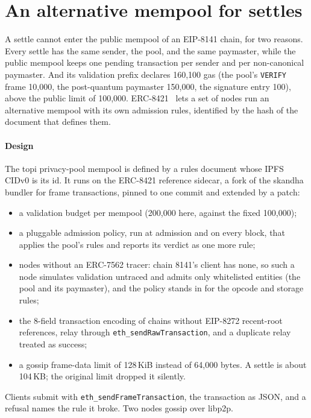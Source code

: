 \documentclass[11pt,a4paper]{article}
\newcommand{\code}[1]{\texttt{\small #1}}
\begin{document}
\section{An alternative mempool for settles}\label{sec:mempool}

A settle cannot enter the public mempool of an EIP-8141 chain, for two reasons. Every settle has the same
sender, the pool, and the same paymaster, while the public mempool keeps one pending transaction per
sender and per non-canonical paymaster. And its validation prefix declares 160,100 gas (the pool's
\code{VERIFY} frame 10,000, the post-quantum paymaster 150,000, the signature entry 100), above the public
limit of 100,000. ERC-8421~\cite{erc8421} lets a set of nodes run an alternative mempool with its own
admission rules, identified by the hash of the document that defines them.

\paragraph{Design} The topi privacy-pool mempool is defined by a rules document whose IPFS CIDv0 is its
id. It runs on the ERC-8421 reference sidecar, a fork of the skandha bundler for frame transactions,
pinned to one commit and extended by a patch:
\begin{itemize}
  \item a validation budget per mempool (200,000 here, against the fixed 100,000);
  \item a pluggable admission policy, run at admission and on every block, that applies the pool's rules
    and reports its verdict as one more rule;
  \item nodes without an ERC-7562 tracer: chain 8141's client has none, so such a node simulates
    validation untraced and admits only whitelisted entities (the pool and its paymaster), and the policy
    stands in for the opcode and storage rules;
  \item the 8-field transaction encoding of chains without EIP-8272 recent-root references, relay through
    \code{eth\_sendRawTransaction}, and a duplicate relay treated as success;
  \item a gossip frame-data limit of 128\,KiB instead of 64,000 bytes. A settle is about 104\,KB; the
    original limit dropped it silently.
\end{itemize}
Clients submit with \code{eth\_sendFrameTransaction}, the transaction as JSON, and a refusal names the rule
it broke. Two nodes gossip over libp2p.
\end{document}
